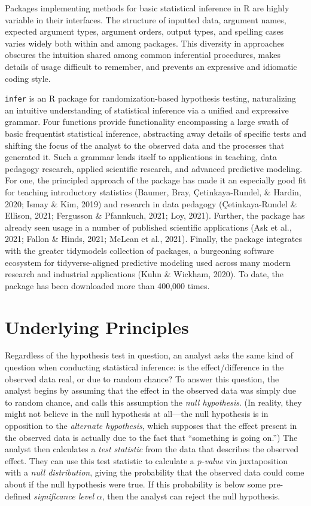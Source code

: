 \documentclass[10pt,a4paper,onecolumn]{article}
\begin{document}
Packages implementing methods for basic statistical inference in R are
highly variable in their interfaces. The structure of inputted data,
argument names, expected argument types, argument orders, output types,
and spelling cases varies widely both within and among packages. This
diversity in approaches obscures the intuition shared among common
inferential procedures, makes details of usage difficult to remember,
and prevents an expressive and idiomatic coding style.

\texttt{infer} is an R package for randomization-based hypothesis
testing, naturalizing an intuitive understanding of statistical
inference via a unified and expressive grammar. Four functions provide
functionality encompassing a large swath of basic frequentist
statistical inference, abstracting away details of specific tests and
shifting the focus of the analyst to the observed data and the processes
that generated it. Such a grammar lends itself to applications in
teaching, data pedagogy research, applied scientific research, and
advanced predictive modeling. For one, the principled approach of the
package has made it an especially good fit for teaching introductory
statistics (Baumer, Bray, Çetinkaya-Rundel, \& Hardin, 2020; Ismay \&
Kim, 2019) and research in data pedagogy (Çetinkaya-Rundel \& Ellison,
2021; Fergusson \& Pfannkuch, 2021; Loy, 2021). Further, the package has
already seen usage in a number of published scientific applications (Ask
et al., 2021; Fallon \& Hinds, 2021; McLean et al., 2021). Finally, the
package integrates with the greater tidymodels collection of packages, a
burgeoning software ecosystem for tidyverse-aligned predictive modeling
used across many modern research and industrial applications (Kuhn \&
Wickham, 2020). To date, the package has been downloaded more than
400,000 times.

\hypertarget{underlying-principles}{%
\section{Underlying Principles}\label{underlying-principles}}

Regardless of the hypothesis test in question, an analyst asks the same
kind of question when conducting statistical inference: is the
effect/difference in the observed data real, or due to random chance? To
answer this question, the analyst begins by assuming that the effect in
the observed data was simply due to random chance, and calls this
assumption the \emph{null hypothesis}. (In reality, they might not
believe in the null hypothesis at all---the null hypothesis is in
opposition to the \emph{alternate hypothesis}, which supposes that the
effect present in the observed data is actually due to the fact that
``something is going on.'') The analyst then calculates a \emph{test
statistic} from the data that describes the observed effect. They can
use this test statistic to calculate a \emph{p-value} via juxtaposition
with a \emph{null distribution}, giving the probability that the
observed data could come about if the null hypothesis were true. If this
probability is below some pre-defined \emph{significance level}
\(\alpha\), then the analyst can reject the null hypothesis.
\end{document}

